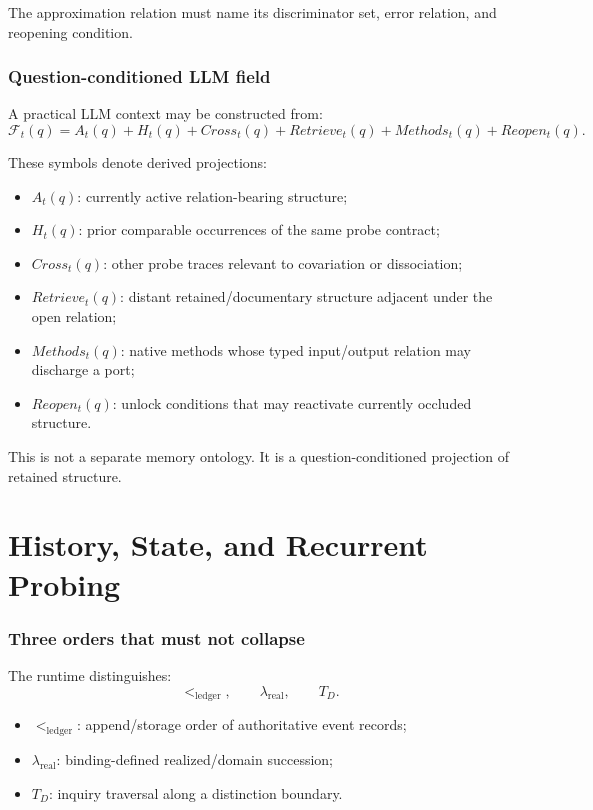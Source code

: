 \documentclass[11pt,oneside]{article}
\begin{document}
The approximation relation must name its discriminator set, error relation, and reopening condition.

\section{Question-conditioned LLM field}

A practical LLM context may be constructed from:
\[
\boxed{
\mathcal F_t(q)
=
A_t(q)
+
H_t(q)
+
Cross_t(q)
+
Retrieve_t(q)
+
Methods_t(q)
+
Reopen_t(q).
}
\]

These symbols denote derived projections:
\begin{itemize}
\item \(A_t(q)\): currently active relation-bearing structure;
\item \(H_t(q)\): prior comparable occurrences of the same probe contract;
\item \(Cross_t(q)\): other probe traces relevant to covariation or dissociation;
\item \(Retrieve_t(q)\): distant retained/documentary structure adjacent under the open relation;
\item \(Methods_t(q)\): native methods whose typed input/output relation may discharge a port;
\item \(Reopen_t(q)\): unlock conditions that may reactivate currently occluded structure.
\end{itemize}

This is not a separate memory ontology.  It is a question-conditioned projection of retained structure.

\part{History, State, and Recurrent Probing}

\section{Three orders that must not collapse}

The runtime distinguishes:
\[
\boxed{
<_{\mathrm{ledger}},
\qquad
\lambda_{\mathrm{real}},
\qquad
T_D.
}
\]

\begin{itemize}
\item \(<_{\mathrm{ledger}}\): append/storage order of authoritative event records;
\item \(\lambda_{\mathrm{real}}\): binding-defined realized/domain succession;
\item \(T_D\): inquiry traversal along a distinction boundary.
\end{itemize}
\end{document}
